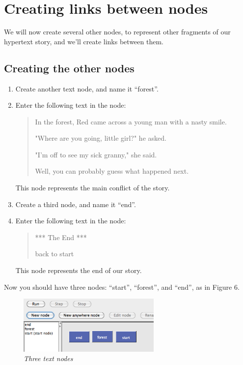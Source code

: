 \documentclass{article}
\begin{document}
\section{Creating links between nodes}

We will now create several other nodes, to represent other fragments of our
hypertext story, and we'll create links between them.

\subsection{Creating the other nodes}

\begin{enumerate}
  \item Create another text node, and name it ``forest''.
  \item Enter the following text in the node:

\begin{quotation}
In the forest, Red came across a young man with a nasty smile.

"Where are you going, little girl?" he asked.

"I'm off to see my sick granny," she said.

Well, you can probably guess what happened next.
\end{quotation}

This node represents the main conflict of the story.

\item Create a third node, and name it ``end''.
\item Enter the following text in the node:

\begin{quotation}
*** The End ***

back to start
\end{quotation}

This node represents the end of our story.
\end{enumerate}

Now you should have three nodes: ``start'', ``forest'', and ``end'', as in Figure 6.

 
\begin{figure}[ht]
  \centering
  \includegraphics[width=7cm]{images/hypedyn-tutorial-1-figure-6}
  \caption{\textit{Three text nodes}}
\end{figure} 
\end{document}
